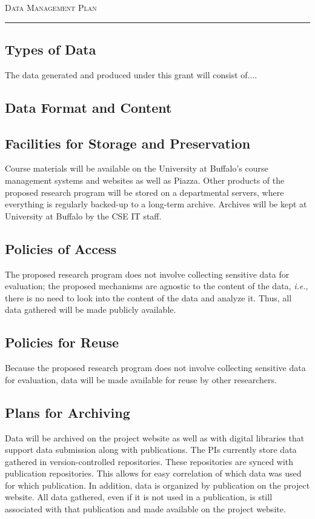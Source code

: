 




\begin{center}
{\LARGE \textsc{Data Management Plan}}
\end{center}
\hrule

\vspace{3mm}

\subsection*{Types of Data}  
The data generated and produced under this grant will consist of....

\subsection*{Data Format and Content}

\subsection*{Facilities for Storage and Preservation}
Course materials will be available on the University at Buffalo's course management systems and websites as well as Piazza.
Other  products of the proposed research program will be stored on a departmental servers, where everything is regularly backed-up to a long-term archive.
Archives will be kept at University at Buffalo by the CSE IT staff.

\subsection*{Policies of Access} 
The proposed research program does not involve collecting sensitive data for evaluation; the proposed mechanisms are agnostic to the content of the data, {\em i.e.}, there is no need to look into the content of the data and analyze it.
Thus, all data gathered will be made publicly available.  

\subsection*{Policies for Reuse}  
Because the proposed research program does not involve collecting sensitive data for evaluation, data will be made available for reuse by other researchers.

\subsection*{Plans for Archiving} 
Data will be archived on the project website as well as with digital libraries that support data submission along with publications.
The PIs currently store data gathered in version-controlled repositories.
These repositories are synced with publication repositories.
This allows for easy correlation of which data was used for which publication.
In addition, data is organized by publication on the project website.
All data gathered, even if it is not used in a publication, is still associated with that publication and made available on the project website.  

